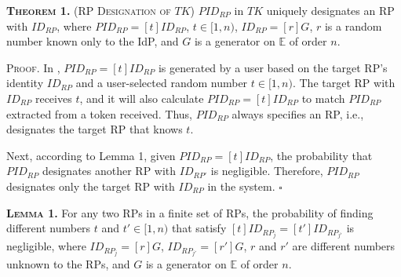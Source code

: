 \vspace{2mm}
\noindent\textsc{\textbf{Theorem 1.} (RP Designation of $TK$)} { $PID_{RP}$ in $TK$ uniquely designates an RP with $ID_{RP}$, where $PID_{RP}= [t]ID_{RP}$, $t \in [1,n)$, $ID_{RP} = [r]G$, $r$ is a random number known only to the IdP, and $G$ is a generator on $\mathbb{E}$ of order $n$.}

\vspace{0.75mm}
\noindent\textsc{Proof.} In \usso, $PID_{RP}=[t]ID_{RP}$ is generated by a user based on the target RP's identity $ID_{RP}$ and a user-selected random number $t \in [1,n)$.
The target RP with $ID_{RP}$ receives $t$,
     and it will also calculate $PID_{RP}=[t]ID_{RP}$ to match $PID_{RP}$ extracted from a token received.
Thus, $PID_{RP}$ always specifies an RP, i.e., %
designates the target RP that knows $t$.

Next, according to Lemma 1, given $PID_{RP} = [t]ID_{RP}$, the probability that $PID_{RP}$ designates another RP with $ID_{RP'}$ is negligible. %
Therefore, $PID_{RP}$ designates only the target RP with $ID_{RP}$ in the system.  \hfill $\square$

\vspace{2mm}
\noindent\textsc{\textbf{Lemma 1.}} { For any two RPs in a finite set of RPs, the probability of finding different numbers $t$ and $t' \in [1,n)$ that satisfy $[t]ID_{RP_j} = [t']ID_{RP_{j'}}$ is negligible, where $ID_{RP_j}=[r]G$, $ID_{RP_{j'}}=[r']G$, $r$ and $r'$ are different numbers unknown to the RPs, and $G$ is a generator on $\mathbb{E}$ of order $n$.}


